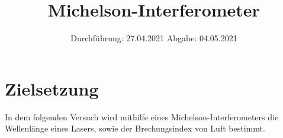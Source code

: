 
\usepackage{parskip}

\subject{V606}
\title{Michelson-Interferometer}
\date{
    Durchführung: 27.04.2021
    \hspace{3em}
    Abgabe: 04.05.2021
}



\maketitle
\thispagestyle{empty}
\tableofcontents
\newpage

\section{Zielsetzung}

    In dem folgenden Versuch wird mithilfe eines Michelson-Interferometers die Wellenlänge eines Lasers,
    sowie der Brechungsindex von Luft bestimmt.


\clearpage


\clearpage

%

%

\printbibliography


